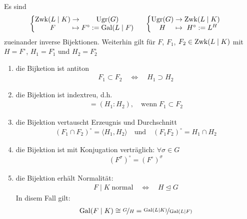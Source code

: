 \begin{theorem}[Galoiskorrespondenz]
	Es sind \begin{align*}
		&\left\lbrace\begin{array}{@{}c@{\;}c@{\;}c}
			\zwk(L\mid K) & \rightarrow & \ugr(G) \\
			F & \mapsto & F^\circ := \Gal(L\mid F)
		\end{array}\right.&
		&\left\lbrace \begin{array}{@{}c@{\;}c@{\;}c}
			\ugr(G) & \rightarrow & \zwk(L\mid K) \\
			H & \mapsto & H^\circ := L^H
		\end{array}\right.
	\end{align*}
	zueinander inverse Bijektionen. Weiterhin gilt für $F$, $F_1$, $F_2\in\operatorname{Zwk}(L\mid K)$ mit $H = F^\circ$, $H_1 = F_1^\circ$ und $H_2 = F_2^\circ$ \begin{enumerate}[label={\roman*)}]
		\item \label{2_2_2_1} die Bijketion ist antiton \begin{align*}
			F_1\subset F_2 \quad\Leftrightarrow\quad H_1\supset H_2
		\end{align*}
		\item \label{2_2_2_2} die Bijektion ist indextreu, d.h.\begin{align*}
			[F_2:F_1] = (H_1:H_2),\quad\text{wenn}\;F_1\subset F_2
		\end{align*}
		\item \label{2_2_2_3} die Bijektion vertauscht Erzeugnis und Durchschnitt \begin{align*}
			(F_1\cap F_2)^\circ = \langle H_1,H_2\rangle\quad\text{und}\quad(F_1F_2)^\circ = H_1\cap H_2
		\end{align*}
		\item \label{2_2_2_4} die Bijektion ist mit Konjugation verträglich: $\forall \sigma\in G$ \begin{align*}
			\left( F^\sigma\right)^\circ = \left( F^\circ\right)^\sigma
		\end{align*}
		\item die Bijektion erhält Normalität: \begin{align*}
			F\mid K\;\text{normal}\quad\Leftrightarrow\quad H\unlhd G
		\end{align*}
		In disem Fall gilt: \begin{align*}
			\Gal(F\mid K) \cong \lnkset{G}{H} = \lnkset{\Gal(L\mid K)}{\Gal(L\mid F)}
		\end{align*}
	\end{enumerate}
\end{theorem}

